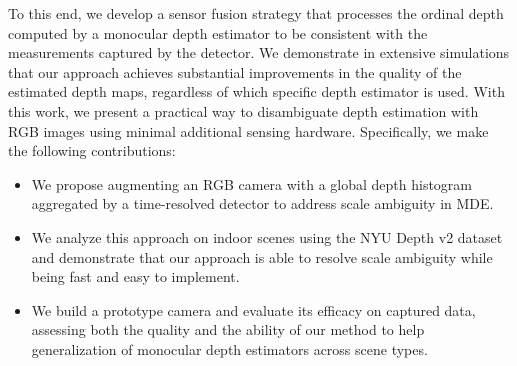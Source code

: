 

To this end, we develop a sensor fusion strategy that processes the ordinal
depth computed by a monocular depth estimator to be consistent with the
measurements captured by the  detector. We demonstrate in extensive
simulations that our approach achieves substantial improvements in the quality
of the estimated depth maps, regardless of which specific depth estimator is
used.   With this
work, we present a practical way to disambiguate depth estimation with RGB
images using minimal additional sensing hardware. Specifically, we make the
following contributions:
%
\begin{itemize}
	\item We propose augmenting an RGB camera with a global depth histogram aggregated by a time-resolved detector to address scale ambiguity in MDE.	
  \item We analyze this approach on indoor scenes using the NYU Depth v2 dataset and demonstrate that our approach is able to resolve scale ambiguity while being fast and easy to implement.
	\item We build a prototype camera and evaluate its efficacy on captured data, assessing both the quality and the ability of our method to help generalization of monocular depth estimators across scene types. 
\end{itemize}




